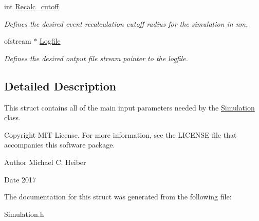 \begin{DoxyCompactItemize}
\mbox{\label{struct_parameters___simulation_af55371ca9e7027e799f5be46e40eacc1}} 
int \hyperlink{struct_parameters___simulation_af55371ca9e7027e799f5be46e40eacc1}{Recalc\+\_\+cutoff}
\begin{DoxyCompactList}\small\item\em Defines the desired event recalculation cutoff radius for the simulation in nm. \end{DoxyCompactList}\item 
\mbox{\label{struct_parameters___simulation_a89fa968cf21d974e02f10dbe9d7bc54a}} 
ofstream $\ast$ \hyperlink{struct_parameters___simulation_a89fa968cf21d974e02f10dbe9d7bc54a}{Logfile}
\begin{DoxyCompactList}\small\item\em Defines the desired output file stream pointer to the logfile. \end{DoxyCompactList}\end{DoxyCompactItemize}


\subsection{Detailed Description}
This struct contains all of the main input parameters needed by the \hyperlink{class_simulation}{Simulation} class. 

\begin{DoxyCopyright}{Copyright}
M\+IT License. For more information, see the L\+I\+C\+E\+N\+SE file that accompanies this software package. 
\end{DoxyCopyright}
\begin{DoxyAuthor}{Author}
Michael C. Heiber 
\end{DoxyAuthor}
\begin{DoxyDate}{Date}
2017 
\end{DoxyDate}


The documentation for this struct was generated from the following file\+:\begin{DoxyCompactItemize}
\item 
Simulation.\+h\end{DoxyCompactItemize}
